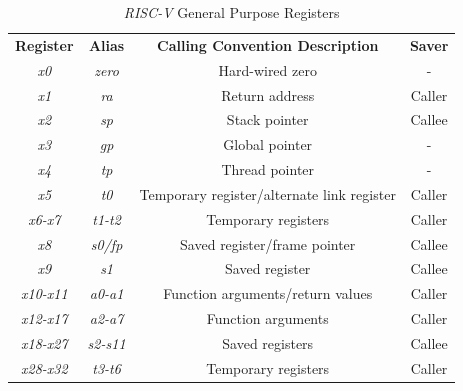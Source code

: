\begin{table}
  \centering
  \begin{tabular}{|c|c|c|c|}
    \hline
    \textbf{Register}         & \textbf{Alias}  & \textbf{Calling Convention Description}    & \textbf{Saver} \\
    \hhline{====} \textit{x0} & \textit{zero}   & Hard-wired zero                            & -              \\
    \hline
    \textit{x1}               & \textit{ra}     & Return address                             & Caller         \\
    \hline
    \textit{x2}               & \textit{sp}     & Stack pointer                              & Callee         \\
    \hline
    \textit{x3}               & \textit{gp}     & Global pointer                             & -              \\
    \hline
    \textit{x4}               & \textit{tp}     & Thread pointer                             & -              \\
    \hline
    \textit{x5}               & \textit{t0}     & Temporary register/alternate link register & Caller         \\
    \hline
    \textit{x6-x7}            & \textit{t1-t2}  & Temporary registers                        & Caller         \\
    \hline
    \textit{x8}               & \textit{s0/fp}  & Saved register/frame pointer               & Callee         \\
    \hline
    \textit{x9}               & \textit{s1}     & Saved register                             & Callee         \\
    \hline
    \textit{x10-x11}          & \textit{a0-a1}  & Function arguments/return values           & Caller         \\
    \hline
    \textit{x12-x17}          & \textit{a2-a7}  & Function arguments                         & Caller         \\
    \hline
    \textit{x18-x27}          & \textit{s2-s11} & Saved registers                            & Callee         \\
    \hline
    \textit{x28-x32}          & \textit{t3-t6}  & Temporary registers                        & Caller         \\
    \hline
  \end{tabular}
  \caption{\textit{RISC-V} General Purpose Registers}
  \label{tab:registers}
\end{table}


